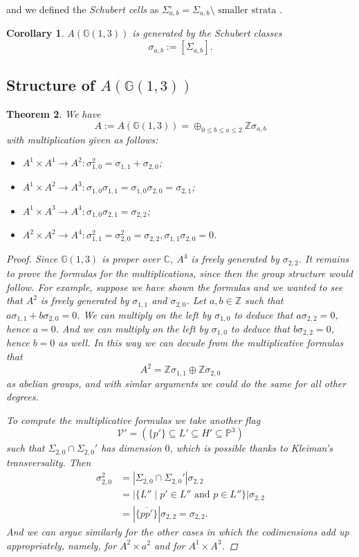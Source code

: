 \documentclass[12pt,a4paper]{amsart}
\theoremstyle{plain}
\newtheorem{thm}{Theorem}
\newtheorem{cor}[thm]{Corollary}
\theoremstyle{definition}
\theoremstyle{remark}
\begin{document}
and we defined the \textit{Schubert cells} as $\Sigma_{a,b}^{\circ}=\Sigma_{a,b} \setminus \text{ smaller strata }$.

\begin{cor}
    $A(\mathbb{G}(1,3))$ is generated by the \textit{Schubert classes}
    \[ \sigma_{a,b}:=[\Sigma_{a,b}]. \]
\end{cor}

\subsection{Structure of $A(\mathbb{G}(1,3))$}

\begin{thm}
    We have
    \[ A:=A(\mathbb{G}(1,3))=\oplus_{0\leq b\leq a \leq 2}\mathbb{Z} \sigma_{a,b} \]
    with multiplication given as follows:
    \begin{itemize}
	\item $A^{1}\times A^{1}\to A^{2}\colon \sigma_{1,0}^{2}=\sigma_{1,1}+\sigma_{2,0}$;
	\item $A^{1}\times A^{2}\to A^{3}\colon \sigma_{1,0}\sigma_{1,1}=\sigma_{1,0}\sigma_{2,0}=\sigma_{2,1}$;
	\item $A^{1}\times A^{3}\to A^{4}\colon \sigma_{1,0}\sigma_{2,1}=\sigma_{2,2}$;
	\item $A^{2}\times A^{2}\to A^{4}\colon \sigma_{1,1}^{2}=\sigma_{2,0}^{2}=\sigma_{2,2},\sigma_{1,1}\sigma_{2,0}=0$.
    \end{itemize}
    \begin{proof}
	Since $\mathbb{G}(1,3)$ is proper over $\mathbb{C}$, $A^{4}$ is freely generated by $\sigma_{2,2}$.
	It remains to prove the formulas for the multiplications, since then the group structure would follow.
	For example, suppose we have shown the formulas and we wanted to see that $A^{2}$ is freely generated by $\sigma_{1,1}$ and $\sigma_{2,0}$.
	Let $a,b\in \mathbb{Z}$ such that $a\sigma_{1,1}+b\sigma_{2,0}=0$.
	We can multiply on the left by $\sigma_{1,0}$ to deduce that $a\sigma_{2,2}=0$, hence $a=0$.
	And we can multiply on the left by $\sigma_{1,0}$ to deduce that $b\sigma_{2,2}=0$, hence $b=0$ as well.
	In this way we can decude from the multiplicative formulas that
	\[ A^{2}= \mathbb{Z} \sigma_{1,1}\oplus \mathbb{Z} \sigma_{2,0} \]
	as abelian groups, and with simlar arguments we could do the same for all other degrees.

	To compute the multiplicative formulas we take another flag
	\[ \mathcal{V}'=\left(\{p'\}\subseteq L'\subseteq H'\subseteq \mathbb{P}^{3}\right) \]
	such that $\Sigma_{2,0}\cap \Sigma_{2,0}'$ has dimension $0$, which is possible thanks to Kleiman's transversality.
	Then
	\begin{align*}
	    \sigma_{2,0}^{2} &=|\Sigma_{2,0}\cap \Sigma_{2,0}'|\sigma_{2,2} \\
	     & =|\{ L''\mid p'\in L''\text{ and }p\in L''\}|\sigma_{2,2} \\
	     & = |\{ \overline{pp'}\}|\sigma_{2,2}=\sigma_{2,2}.
	\end{align*}
	And we can argue similarly for the other cases in which the codimensions add up appropriately, namely, for $A^{2}\times a^{2}$ and for $A^{1}\times A^{3}$.


\end{proof}
\end{thm}
\end{document}
